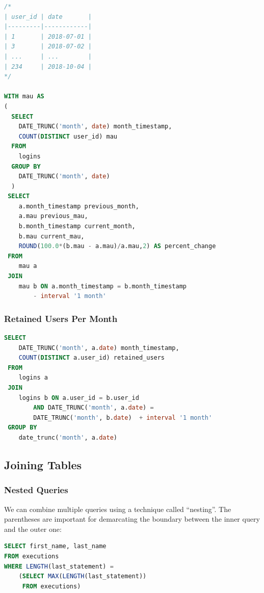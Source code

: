 \documentclass{article}
\begin{document}
\vspace{8pt} \begin{lstlisting}[language=SQL]
/*
| user_id | date       |
|---------|------------|
| 1       | 2018-07-01 |
| 3       | 2018-07-02 |
| ...     | ...        |
| 234     | 2018-10-04 |
*/

WITH mau AS 
(
  SELECT 
    DATE_TRUNC('month', date) month_timestamp,
    COUNT(DISTINCT user_id) mau
  FROM 
    logins 
  GROUP BY 
    DATE_TRUNC('month', date)
  )
 SELECT 
    a.month_timestamp previous_month, 
    a.mau previous_mau, 
    b.month_timestamp current_month, 
    b.mau current_mau, 
    ROUND(100.0*(b.mau - a.mau)/a.mau,2) AS percent_change 
 FROM
    mau a 
 JOIN 
    mau b ON a.month_timestamp = b.month_timestamp 
        - interval '1 month' 
\end{lstlisting}

\subsubsection{Retained Users Per Month}

\vspace{8pt} \begin{lstlisting}[language=SQL]
SELECT 
    DATE_TRUNC('month', a.date) month_timestamp, 
    COUNT(DISTINCT a.user_id) retained_users 
 FROM 
    logins a 
 JOIN 
    logins b ON a.user_id = b.user_id 
        AND DATE_TRUNC('month', a.date) = 
        DATE_TRUNC('month', b.date)  + interval '1 month'
 GROUP BY 
    date_trunc('month', a.date)
\end{lstlisting}

\subsection{Joining Tables}
\subsubsection{Nested Queries}
We can combine multiple queries using a technique called ``nesting”. The parentheses are important for demarcating the boundary between the inner query and the outer one:

\vspace{8pt} \begin{lstlisting}[language=SQL]
SELECT first_name, last_name
FROM executions
WHERE LENGTH(last_statement) =
    (SELECT MAX(LENGTH(last_statement))
     FROM executions)
\end{lstlisting} \vspace{8pt}
\end{document}
